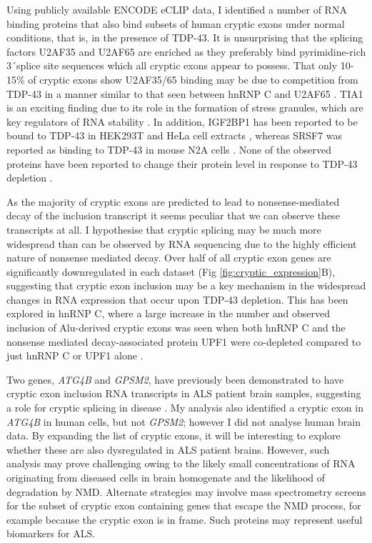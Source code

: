 Using publicly available ENCODE eCLIP data, I identified a number of RNA binding proteins that also bind subsets of human cryptic exons under normal conditions, that is, in the presence of TDP-43.  It is unsurprising that the splicing factors U2AF35 and U2AF65 are enriched as they preferably bind pyrimidine-rich 3\'\ splice site sequences which all cryptic exons appear to possess. That only 10-15\% of cryptic exons show U2AF35/65 binding may be due to competition from TDP-43 in a manner similar to that seen between hnRNP C and U2AF65 \citep{Zarnack2013}. TIA1 is an exciting finding due to its role in the formation of stress granules, which are key regulators of RNA stability \citep{gilks2004stress}. In addition, IGF2BP1 has been reported to be bound to TDP-43 in HEK293T and HeLa cell extracts \citep{Ling2010-sr,Freibaum2010-hw}, whereas SRSF7 was reported as binding to TDP-43 in mouse N2A cells \citep{Blokhuis2016-hw}. None of the observed proteins have been reported to change their protein level in response to TDP-43 depletion \citep{Stalekar2015-qd}.

As the majority of cryptic exons are predicted to lead to nonsense-mediated decay of the inclusion transcript it seems peculiar that we can observe these transcripts at all. I hypothesise that cryptic splicing may be much more widespread than can be observed by RNA sequencing due to the highly efficient nature of nonsense mediated decay. Over half of all cryptic exon genes are significantly downregulated in each dataset (Fig \ref{fig:cryptic_expression}B), suggesting that cryptic exon inclusion may be a key mechanism in the widespread changes in RNA expression that occur upon TDP-43 depletion. This has been explored in hnRNP C, where a large increase in the number and observed inclusion of Alu-derived cryptic exons was seen when both hnRNP C and the nonsense mediated decay-associated protein UPF1 were co-depleted compared to just hnRNP C or UPF1 alone \citep{Attig2016}.

Two genes, \emph{ATG4B} and \emph{GPSM2}, have previously been demonstrated to have cryptic exon inclusion RNA transcripts in ALS patient brain samples, suggesting a role for cryptic splicing in disease \citep{Ling2015}. My analysis also identified a cryptic exon in \emph{ATG4B} in human cells, but not \emph{GPSM2}; however I did not analyse human brain data. By expanding the list of cryptic exons, it will be interesting to explore whether these are also dysregulated in ALS patient brains. However, such analysis may prove challenging owing to the likely small concentrations of RNA originating from diseased cells in brain homogenate and the likelihood of degradation by NMD. Alternate strategies may involve mass spectrometry screens for the subset of cryptic exon containing genes that escape the NMD process, for example because the cryptic exon is in frame. Such proteins may represent useful biomarkers for ALS. 

